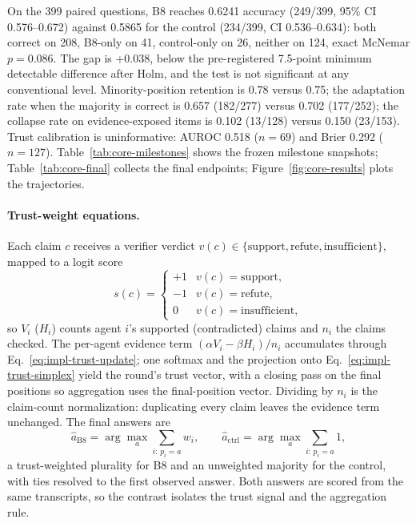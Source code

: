 On the 399 paired questions, B8 reaches 0.6241 accuracy (249/399, 95\% CI 0.576--0.672) against 0.5865 for the control (234/399, CI 0.536--0.634): both correct on 208, B8-only on 41, control-only on 26, neither on 124, exact McNemar $p=0.086$. The gap is +0.038, below the pre-registered 7.5-point minimum detectable difference after Holm, and the test is not significant at any conventional level. Minority-position retention is 0.78 versus 0.75; the adaptation rate when the majority is correct is 0.657 (182/277) versus 0.702 (177/252); the collapse rate on evidence-exposed items is 0.102 (13/128) versus 0.150 (23/153). Trust calibration is uninformative: AUROC 0.518 ($n=69$) and Brier 0.292 ($n=127$). Table~\ref{tab:core-milestones} shows the frozen milestone snapshots; Table~\ref{tab:core-final} collects the final endpoints; Figure~\ref{fig:core-results} plots the trajectories.

\paragraph*{Trust-weight equations.}
Each claim $c$ receives a verifier verdict $v(c) \in \{\mathrm{support}, \mathrm{refute}, \mathrm{insufficient}\}$, mapped to a logit score
\begin{equation}
  s(c) = \begin{cases} +1 & v(c)=\mathrm{support}, \\ -1 & v(c)=\mathrm{refute}, \\ 0 & v(c)=\mathrm{insufficient}, \end{cases}
  \label{eq:impl-verdict-score}
\end{equation}
so $V_i$ ($H_i$) counts agent $i$'s supported (contradicted) claims and $n_i$ the claims checked. The per-agent evidence term $(\alpha V_i-\beta H_i)/n_i$ accumulates through Eq.~\eqref{eq:impl-trust-update}; one softmax and the projection onto Eq.~\eqref{eq:impl-trust-simplex} yield the round's trust vector, with a closing pass on the final positions so aggregation uses the final-position vector. Dividing by $n_i$ is the claim-count normalization: duplicating every claim leaves the evidence term unchanged. The final answers are
\begin{equation}
  \hat{a}_{\mathrm{B8}} = \arg\max_a \sum_{i:\,p_i=a} w_i, \qquad \hat{a}_{\mathrm{ctrl}} = \arg\max_a \sum_{i:\,p_i=a} 1,
  \label{eq:impl-decision}
\end{equation}
a trust-weighted plurality for B8 and an unweighted majority for the control, with ties resolved to the first observed answer. Both answers are scored from the same transcripts, so the contrast isolates the trust signal and the aggregation rule.

